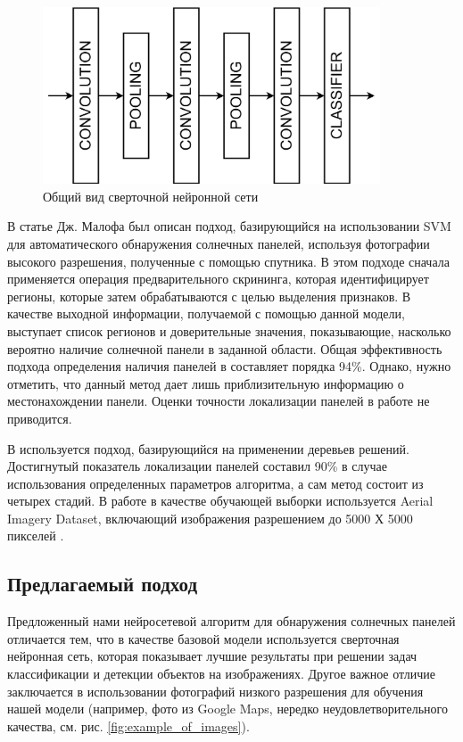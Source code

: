 \begin{figure}[ht]
	\centering
	\includegraphics[width=10cm]{man-source/images/ch4/pic4-15.png}
	\caption{Общий вид сверточной нейронной сети}
	\label{fig:cnn_common_view}
\end{figure}

В статье Дж. Малофа \cite{malof2015} был описан подход, базирующийся на использовании SVM для автоматического обнаружения солнечных панелей, используя фотографии высокого разрешения, полученные с помощью спутника. В этом подходе сначала применяется операция предварительного скрининга, которая идентифицирует регионы, которые затем обрабатываются с целью выделения признаков. В качестве выходной информации, получаемой с помощью данной модели, выступает список регионов и доверительные значения, показывающие, насколько вероятно наличие солнечной панели в заданной области. Общая эффективность подхода определения наличия панелей в \cite{malof2015} составляет порядка 94\%. Однако, нужно отметить, что данный метод дает лишь приблизительную информацию о местонахождении панели. Оценки точности локализации панелей в работе не приводится.

В \cite{malof2016} используется подход, базирующийся на применении деревьев решений. Достигнутый показатель локализации панелей составил 90\% в случае использования определенных параметров алгоритма, а сам метод состоит из четырех стадий. В работе в качестве обучающей выборки используется Aerial Imagery Dataset, включающий изображения разрешением до 5000 Х 5000 пикселей \cite{bradbury2016}.

\subsection{Предлагаемый подход}

Предложенный нами нейросетевой алгоритм для обнаружения солнечных панелей отличается тем, что в качестве базовой модели используется сверточная нейронная сеть, которая показывает лучшие результаты при решении задач классификации и детекции объектов на изображениях. Другое важное отличие заключается в использовании фотографий низкого разрешения для обучения нашей модели (например, фото из Google Maps, нередко неудовлетворительного качества, см. рис. \ref{fig:example_of_images}). 

